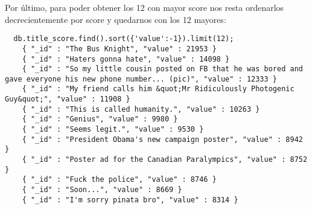 Por último, para poder obtener los 12 con mayor score nos resta ordenarlos
decrecientemente por score y quedarnos con los 12 mayores:
\begin{lstlisting}
  db.title_score.find().sort({'value':-1}).limit(12);
    { "_id" : "The Bus Knight", "value" : 21953 }
    { "_id" : "Haters gonna hate", "value" : 14098 }
    { "_id" : "So my little cousin posted on FB that he was bored and gave everyone his new phone number... (pic)", "value" : 12333 }
    { "_id" : "My friend calls him &quot;Mr Ridiculously Photogenic Guy&quot;", "value" : 11908 }
    { "_id" : "This is called humanity.", "value" : 10263 }
    { "_id" : "Genius", "value" : 9980 }
    { "_id" : "Seems legit.", "value" : 9530 }
    { "_id" : "President Obama's new campaign poster", "value" : 8942 }
    { "_id" : "Poster ad for the Canadian Paralympics", "value" : 8752 }
    { "_id" : "Fuck the police", "value" : 8746 }
    { "_id" : "Soon...", "value" : 8669 }
    { "_id" : "I'm sorry pinata bro", "value" : 8314 }
\end{lstlisting}


